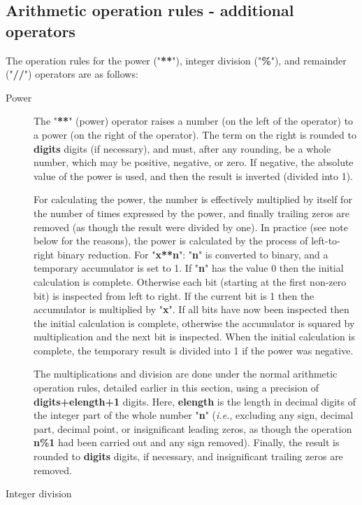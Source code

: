 \subsection{Arithmetic operation rules - additional operators}
 The operation rules for the power ("\textbf{**}"),
integer division ("\textbf{\%}"), and remainder
("\textbf{//}") operators are as follows:
\begin{description}
\item[Power]\label{refpower}

The "\textbf{**}" (power) operator raises a number (on the
left of the operator) to a power (on the right of the operator).
The term on the right is rounded to \textbf{digits} digits (if
necessary), and must, after any rounding, be a whole number, which may
be positive, negative, or zero.
If negative, the absolute value of the power is used, and then the
result is inverted (divided into 1).
 
For calculating the power, the number is effectively multiplied by
itself for the number of times expressed by the power, and finally
trailing zeros are removed (as though the result were divided by one).
 In practice (see note below for the reasons), the power is
calculated by the process of left-to-right binary reduction.
For "\textbf{x**n}": "\textbf{n}" is converted to
binary, and a temporary accumulator is set to 1.
If "\textbf{n}" has the value 0 then the initial calculation is
complete.
Otherwise each bit (starting at the first non-zero bit) is inspected
from left to right.
If the current bit is 1 then the accumulator is multiplied by
"\textbf{x}".
If all bits have now been inspected then the initial calculation is
complete, otherwise the accumulator is squared by multiplication and the
next bit is inspected.
When the initial calculation is complete, the temporary result is
divided into 1 if the power was negative.
 
The multiplications and division are done under the normal
arithmetic operation rules, detailed earlier in this section, using a
precision of \textbf{digits+elength+1} digits.
Here, \textbf{elength} is the length in decimal digits of the integer
part of the whole number "\textbf{n}" (\emph{i.e.}, excluding any sign,
decimal part, decimal point, or insignificant leading zeros, as though
the operation \textbf{n\%1} had been carried out and any sign removed).
Finally, the result is rounded to \textbf{digits} digits, if
necessary, and insignificant trailing zeros are removed.
\item[Integer division]


\end{description}
